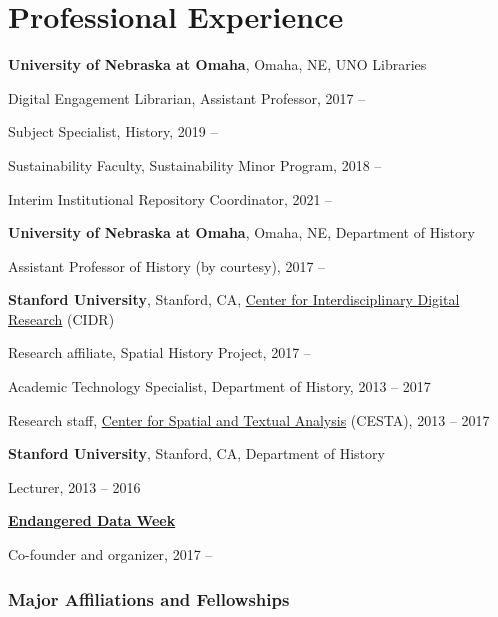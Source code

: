 \section{Professional Experience}\label{professional-experience}

\textbf{University of Nebraska at Omaha}, Omaha, NE, UNO Libraries

\quad Digital Engagement Librarian, Assistant Professor, 2017 --

\quad Subject Specialist, History, 2019 --

\quad Sustainability Faculty, Sustainability Minor Program, 2018 --

\quad Interim Institutional Repository Coordinator, 2021 --

\vspace{.4cm}

\textbf{University of Nebraska at Omaha}, Omaha, NE, Department of
History

\quad Assistant Professor of History (by courtesy), 2017 --

\vspace{.4cm}

\textbf{Stanford University}, Stanford, CA,
\href{http://cidr.stanford.edu}{Center for Interdisciplinary Digital
Research} (CIDR)

\quad Research affiliate, Spatial History Project, 2017 --

\quad Academic Technology Specialist, Department of History, 2013 --
2017

\quad Research staff, \href{http://cesta.stanford.edu}{Center for
Spatial and Textual Analysis} (CESTA), 2013 -- 2017

\vspace{.4cm}

\textbf{Stanford University}, Stanford, CA, Department of History

\quad Lecturer, 2013 -- 2016

\vspace{.4cm}

\textbf{\href{https://endangereddataweek.org}{Endangered Data Week}}

\quad Co-founder and organizer, 2017 --

\vspace{0.2cm}

\subsubsection{Major Affiliations and
Fellowships}\label{major-affiliations-and-fellowships}

